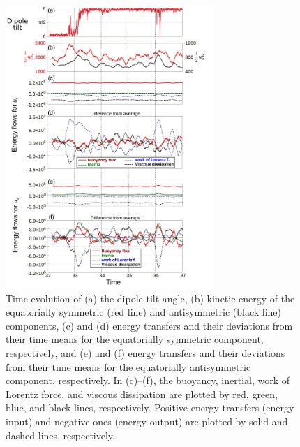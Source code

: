 \begin{figure}[ht]
\hspace*{\fill}
\includegraphics*[width=79mm]
{Figures/rev11_Energy_flux_evolution.png}
\hspace*{\fill}
\caption{
Time evolution of (a) the dipole tilt angle, (b) kinetic energy of the equatorially symmetric (red line) and antisymmetric (black line) components, (c) and (d) energy transfers and their deviations from their time means for the equatorially symmetric component, respectively, and (e) and (f) energy transfers and their deviations from their time means for the equatorially antisymmetric component, respectively.
In (c)--(f), the buoyancy, inertial, work of Lorentz force, and viscous dissipation are plotted by red, green, blue, and black lines, respectively.
Positive energy transfers (energy input) and negative ones (energy output) are plotted by solid and dashed lines, respectively.
}
\label{fig:energy_flux_evolution_retry1_1}
\end{figure}